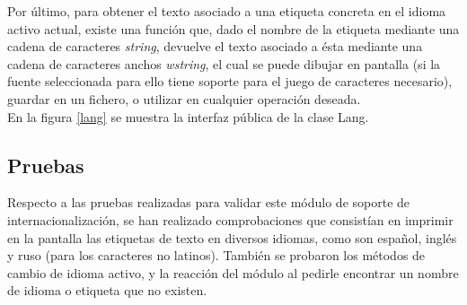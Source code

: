 Por último, para obtener el texto asociado a una etiqueta concreta en el idioma activo actual, existe una función que, dado el nombre de la etiqueta mediante una cadena de caracteres \emph{string}, devuelve el texto asociado a ésta mediante una cadena de caracteres anchos \emph{wstring}, el cual se puede dibujar en pantalla (si la fuente seleccionada para ello tiene soporte para el juego de caracteres necesario), guardar en un fichero, o utilizar en cualquier operación deseada.\\

En la figura \ref{lang} se muestra la interfaz pública de la clase Lang.\\


\subsection{Pruebas}

Respecto a las pruebas realizadas para validar este módulo de soporte de internacionalización, se han realizado comprobaciones que consistían en imprimir en la pantalla las etiquetas de texto en diversos idiomas, como son español, inglés y ruso (para los caracteres no latinos). También se probaron los métodos de cambio de idioma activo, y la reacción del módulo al pedirle encontrar un nombre de idioma o etiqueta que no existen.

